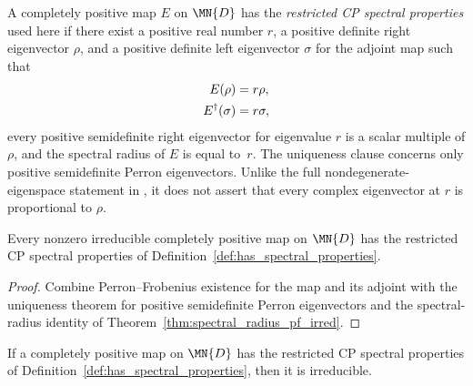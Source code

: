 \begin{definition}
    \label{def:has_spectral_properties}
    \leanok
    A completely positive map $E$ on $\MN{D}$ has the \emph{restricted CP
        spectral properties} used here if there exist a positive real number $r$, a positive
    definite right eigenvector $\rho$, and a positive definite left eigenvector
    $\sigma$ for the adjoint map such that
    \begin{align}
        E(\rho)
         & =r\rho, \notag \\
        E^\dagger(\sigma)
         & =r\sigma,
        \label{eq:qpf_spectral_eigenvectors}
    \end{align}
    every positive semidefinite right eigenvector for eigenvalue $r$ is a
    scalar multiple of $\rho$, and the spectral radius of $E$ is equal to~$r$.
    The uniqueness clause concerns only positive semidefinite Perron
    eigenvectors. Unlike the full nondegenerate-eigenspace statement in
    \cite[Theorem~6.4]{Wolf2012Quantum}, it does not assert that every complex
    eigenvector at $r$ is proportional to $\rho$.
\end{definition}

\begin{theorem}
    \label{thm:has_spectral_properties_irred}
    \leanok
    Every nonzero irreducible completely positive map on $\MN{D}$ has the
    restricted CP spectral properties of Definition~\ref{def:has_spectral_properties}.
\end{theorem}

\begin{proof}
    \leanok
    Combine Perron--Frobenius existence for the map and its adjoint with the
    uniqueness theorem for positive semidefinite Perron eigenvectors and the
    spectral-radius identity of
    Theorem~\ref{thm:spectral_radius_pf_irred}.
\end{proof}

\begin{theorem}
    \label{thm:irred_from_spectral_properties}
    \leanok
    If a completely positive map on $\MN{D}$ has the restricted CP spectral properties of
    Definition~\ref{def:has_spectral_properties}, then it is irreducible.
\end{theorem}

